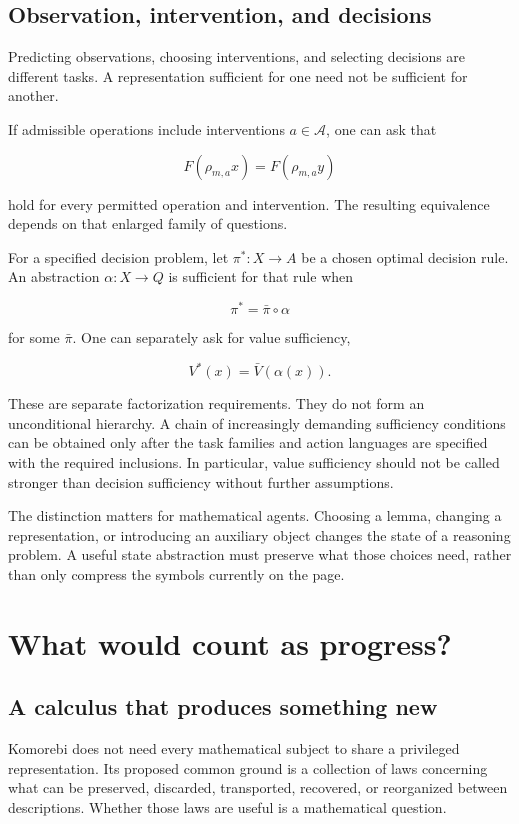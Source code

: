 \documentclass[11pt,oneside,openany]{book}
\begin{document}
\section{Observation, intervention, and decisions}
Predicting observations, choosing interventions, and selecting decisions are different tasks. A representation sufficient for one need not be sufficient for another.

If admissible operations include interventions \(a\in\mathcal A\), one can ask that

\[
F(\rho_{m,a}x)=F(\rho_{m,a}y)
\]

hold for every permitted operation and intervention. The resulting equivalence depends on that enlarged family of questions.

For a specified decision problem, let \(\pi^*:X\longrightarrow A\) be a chosen optimal decision rule. An abstraction \(\alpha:X\longrightarrow Q\) is sufficient for that rule when

\[
\pi^*=\bar\pi\circ\alpha
\]

for some \(\bar\pi\). One can separately ask for value sufficiency,

\[
V^*(x)=\bar V(\alpha(x)).
\]

These are separate factorization requirements. They do not form an unconditional hierarchy. A chain of increasingly demanding sufficiency conditions can be obtained only after the task families and action languages are specified with the required inclusions. In particular, value sufficiency should not be called stronger than decision sufficiency without further assumptions.

The distinction matters for mathematical agents. Choosing a lemma, changing a representation, or introducing an auxiliary object changes the state of a reasoning problem. A useful state abstraction must preserve what those choices need, rather than only compress the symbols currently on the page.

\chapter{What would count as progress?}
\section{A calculus that produces something new}
Komorebi does not need every mathematical subject to share a privileged representation. Its proposed common ground is a collection of laws concerning what can be preserved, discarded, transported, recovered, or reorganized between descriptions. Whether those laws are useful is a mathematical question.
\end{document}
